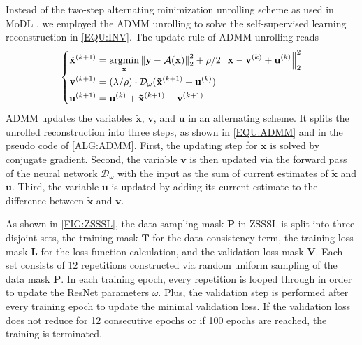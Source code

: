 \documentclass[journal,twoside,web]{ieeecolor}
\newcommand{\argmin}{\operatornamewithlimits{argmin}}
\newcommand{\norm}[1]{\left\lVert#1\right\rVert}
\begin{document}
    Instead of the two-step alternating minimization unrolling scheme as used in MoDL
    \cite{aggarwal_2018_modl},
    we employed the ADMM unrolling
    to solve the self-supervised learning reconstruction
    in \cref{EQU:INV}. The update rule of ADMM unrolling reads
	\begin{equation} \label{EQU:ADMM}
		\left\{\begin{aligned}
			\mathbf{\tilde{x}}^{(k+1)} &= \argmin_{\mathbf{x}} \norm{\mathbf{y} - \mathcal{A}(\mathbf{x})}_2^2 + \rho/2 \norm{ \mathbf{x} - \mathbf{v}^{(k)} + \mathbf{u}^{(k)}}_2^2 \\
			\mathbf{v}^{(k+1)} &= (\lambda/\rho) \cdot \mathcal{D}_{\omega} (\mathbf{\tilde{x}}^{(k+1)} + \mathbf{u}^{(k)}) \\
			\mathbf{u}^{(k+1)} &= \mathbf{u}^{(k)} + \mathbf{\tilde{x}}^{(k+1)} - \mathbf{v}^{(k+1)}
		\end{aligned}\right.
	\end{equation}
    ADMM updates the variables $\mathbf{\tilde{x}}$, $\mathbf{v}$,
    and $\mathbf{u}$ in an alternating scheme.
    It splits the unrolled reconstruction into three steps,
    as shown in \cref{EQU:ADMM} and in the pseudo code of \cref{ALG:ADMM}.
    First, the updating step for $\mathbf{\tilde{x}}$ is solved by conjugate gradient.
    Second, the variable $\mathbf{v}$ is then updated
    via the forward pass of the neural network $\mathcal{D}_{\omega}$
    with the input as the sum of current estimates
    of $\mathbf{\tilde{x}}$ and $\mathbf{u}$.
    Third, the variable $\mathbf{u}$ is updated
    by adding its current estimate to the difference
    between $\mathbf{\tilde{x}}$ and $\mathbf{v}$.
    
    As shown in \cref{FIG:ZSSSL}, the data sampling mask $\mathbf{P}$ 
    in ZSSSL \cite{yaman_2022_zs} is split into 
    three disjoint sets, the training mask $\mathbf{T}$ for the data consistency term, 
    the training loss mask $\mathbf{L}$ for the loss function calculation, 
    and the validation loss mask $\mathbf{V}$. 
    Each set consists of 12 repetitions constructed via random uniform sampling 
    of the data mask $\mathbf{P}$. 
    In each training epoch, every repetition is looped through 
    in order to update the ResNet parameters $\omega$. 
    Plus, the validation step is performed after every training epoch 
    to update the minimal validation loss. 
    If the validation loss does not reduce for 12 consecutive epochs or 
    if 100 epochs are reached, the training is terminated.
\end{document}
